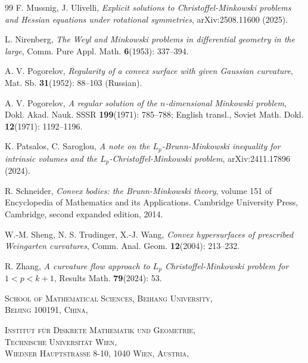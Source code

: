 \documentclass[12pt]{amsart}
\numberwithin{equation}{section}
\newcommand{\8}{\infty}
\begin{document}
\begin{thebibliography}{99}
 F. Mussnig, J. Ulivelli, \textit{Explicit solutions to Christoffel-Minkowski problems and Hessian equations under rotational symmetries}, arXiv:2508.11600 (2025).

L. Nirenberg, \textit{The Weyl and Minkowski problems in differential geometry in the large}, Comm. Pure Appl. Math. \textbf{6}(1953): 337--394.

A. V. Pogorelov, \textit{Regularity of a convex surface with given Gaussian curvature}, Mat. Sb. \textbf{31}(1952): 88--103 (Russian).

A. V. Pogorelov, \textit{A regular solution of the $n$-dimensional Minkowski problem}, Dokl. Akad. Nauk. SSSR \textbf{199}(1971): 785--788; English transl., Soviet Math. Dokl. \textbf{12}(1971): 1192--1196.

K. Patsalos, C. Saroglou, \textit{A note on the $ L_p $-Brunn-Minkowski inequality for intrinsic volumes and the $ L_p $-Christoffel-Minkowski problem}, arXiv:2411.17896 (2024).

R. Schneider, \textit{Convex bodies: the Brunn-Minkowski theory}, volume 151 of Encyclopedia of Mathematics and its Applications. 
Cambridge University Press, Cambridge, second expanded edition, 2014.

W.-M. Sheng, N. S. Trudinger, X.-J. Wang, \textit{Convex hypersurfaces of prescribed Weingarten curvatures}, Comm. Anal. Geom. \textbf{12}(2004): 213--232.

R. Zhang, \textit{A curvature flow approach to $L_p$ Christoffel-Minkowski problem for $1<p<k+1$}, Results Math. \textbf{79}(2024): 53.

\end{thebibliography}

\vspace{5mm}
	
	\textsc{School of Mathematical Sciences, Beihang University,\\ Beijing 100191, China,\\}

	
\vspace{5mm}
        
\textsc{Institut f\"{u}r Diskrete Mathematik und Geometrie,\\ Technische Universit\"{a}t Wien,\\ Wiedner Hauptstra{\ss}e 8-10, 1040 Wien, Austria,\\} 
\end{document}

